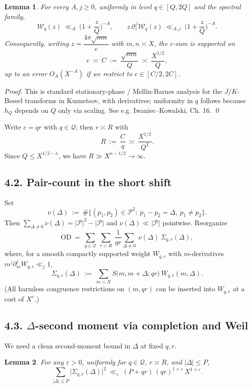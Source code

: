 \documentclass[11pt]{article}
\newtheorem{lemma}{Lemma}[section]
\theoremstyle{definition}
\theoremstyle{remark}
\begin{document}
\begin{lemma}\label{lem:kernel}
For every $A,j\ge 0$, uniformly in level $q\in[Q,2Q]$ and the spectral family,
\[
\mathcal W_q(z)\ \ll_A\ \Big(1+\frac{z}{Q}\Big)^{-A},\qquad
z\,\partial_z^{\,j}\mathcal W_q(z)\ \ll_{A,j}\ \Big(1+\frac{z}{Q}\Big)^{-A}.
\]
Consequently, writing $z=\dfrac{4\pi\sqrt{mn}}{c}$ with $m,n\asymp X$, the $c$-sum is supported on
\[
c\ \asymp\ C\ :=\ \frac{\sqrt{mn}}{Q}\ \asymp\ \frac{X^{1/2}}{Q},
\]
up to an error $O_A(X^{-A})$ if we restrict to $c\in[C/2,2C]$.
\end{lemma}

\emph{Proof.} This is standard stationary-phase / Mellin-Barnes analysis for the $J$/$K$-Bessel transforms in Kuznetsov, with derivatives; uniformity in $q$ follows because $h_Q$ depends on $Q$ only via scaling. See e.g. Iwaniec–Kowalski, Ch. 16. \qed

Write $c=qr$ with $q\in\mathcal Q$; then $r\asymp R$ with
\begin{equation}\label{eq:Rdef}
R\ :=\ \frac{C}{q}\ \asymp\ \frac{X^{1/2}}{Q^2}.
\end{equation}
Since $Q\le X^{1/2-\kappa}$, we have $R\gg X^{\kappa-1/2}\to\infty$.

\subsection*{4.2. Pair-count in the short shift}
Set
\[
\nu(\Delta)\ :=\ \#\{(p_1,p_2)\in\mathcal P^2:\ p_1-p_2=\Delta,\ p_1\neq p_2\}.
\]
Then $\sum_{\Delta\neq 0}\nu(\Delta)=|\mathcal P|^2-|\mathcal P|$ and $\nu(\Delta)\ll |\mathcal P|$ pointwise. Reorganize
\[
\mathrm{OD}\ =\ \sum_{q\in\mathcal Q}\ \sum_{r\asymp R}\ \frac{1}{qr}
\sum_{\Delta\neq 0}\ \nu(\Delta)\ \Sigma_{q,r}(\Delta),
\]
where, for a smooth compactly supported weight $W_{q,r}$ with $m$-derivatives $m^j\partial_m^jW_{q,r}\ll_j 1$,
\[
\Sigma_{q,r}(\Delta)\ :=\ \sum_{m\asymp X} S\!\big(m,m+\Delta;qr\big)\ W_{q,r}(m,\Delta).
\]
(All harmless congruence restrictions on $(m,qr)$ can be inserted into $W_{q,r}$ at a cost of $X^\varepsilon$.)

\subsection*{4.3. $\Delta$-second moment via completion and Weil}
We need a clean second-moment bound in $\Delta$ at fixed $q,r$.

\begin{lemma}\label{lem:Delta2}
For any $\varepsilon>0$, uniformly for $q\in\mathcal Q$, $r\asymp R$, and $|\Delta|\le P$,
\[
\sum_{|\Delta|\le P}\big|\Sigma_{q,r}(\Delta)\big|^2
\ \ll_\varepsilon\ (P+qr)\,(qr)^{1+\varepsilon}\,X^{1+\varepsilon}.
\]
\end{lemma}
\end{document}
